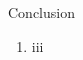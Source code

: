 
\begin{frame}{Conclusion}
    \begin{enumerate}[<+-|alert@+>][$\blacksquare$]
        \item iii
    \end{enumerate}
\end{frame}


